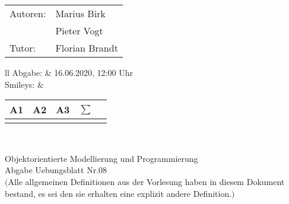 \documentclass[12pt,a4paper,oneside,ngerman]{article}
\newcommand{\fach}{Objektorientierte Modellierung und Programmierung}
\newcommand{\dokumentenTitel}{Abgabe Uebungsblatt Nr.08}
\newcommand{\Abgabe}{16.06.2020, 12:00 Uhr}
\newcommand{\memberOne}{Marius Birk}
\newcommand{\memberTwo}{Pieter Vogt}
\newcommand{\tutor}{ Florian Brandt }
\begin{document}
	\thispagestyle{plain} %
	
	\begin{multicols}{2} %
		\hspace{-1cm} %
		\begin{tabular}{ll} %
			Autoren: & \memberOne \\ %
			& \memberTwo \\
			Tutor: & \tutor \\  
		\end{tabular}
		
		\columnbreak %
		\hspace{-1cm} %
		\begin{tabular}{ll} %
			Abgabe: & \Abgabe \\ %
			Smileys: &  
			\renewcommand{\arraystretch}{1.2} 
			\begin{tabular}{|p{0.8cm}|p{0.8cm}|p{0.8cm}|p{0.8cm}|p{0.8cm}|}
				\hline A1 & A2 & A3 &$\sum\limits^{ }$ \\ \hline
				& & & \\ \hline    
			\end{tabular} \\
		\end{tabular}
		
	\end{multicols} %
	
	\begin{center}
		\Large{\fach} \\
		\LARGE{\dokumentenTitel} \\
		\small
		$($Alle allgemeinen Definitionen aus der Vorlesung haben in diesem Dokument bestand, es sei den sie erhalten eine explizit andere Definition.$)$
	\end{center}
\end{document}
